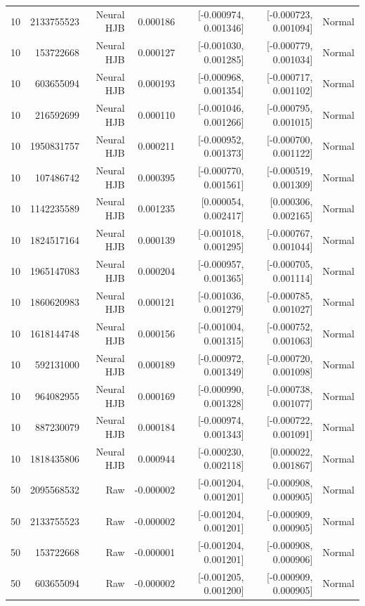 \begin{longtable}{lrrrrrr}
10 & 2133755523 & Neural HJB & 0.000186 & [-0.000974, 0.001346] & [-0.000723, 0.001094] & Normal \\
10 & 153722668 & Neural HJB & 0.000127 & [-0.001030, 0.001285] & [-0.000779, 0.001034] & Normal \\
10 & 603655094 & Neural HJB & 0.000193 & [-0.000968, 0.001354] & [-0.000717, 0.001102] & Normal \\
10 & 216592699 & Neural HJB & 0.000110 & [-0.001046, 0.001266] & [-0.000795, 0.001015] & Normal \\
10 & 1950831757 & Neural HJB & 0.000211 & [-0.000952, 0.001373] & [-0.000700, 0.001122] & Normal \\
10 & 107486742 & Neural HJB & 0.000395 & [-0.000770, 0.001561] & [-0.000519, 0.001309] & Normal \\
10 & 1142235589 & Neural HJB & 0.001235 & [0.000054, 0.002417] & [0.000306, 0.002165] & Normal \\
10 & 1824517164 & Neural HJB & 0.000139 & [-0.001018, 0.001295] & [-0.000767, 0.001044] & Normal \\
10 & 1965147083 & Neural HJB & 0.000204 & [-0.000957, 0.001365] & [-0.000705, 0.001114] & Normal \\
10 & 1860620983 & Neural HJB & 0.000121 & [-0.001036, 0.001279] & [-0.000785, 0.001027] & Normal \\
10 & 1618144748 & Neural HJB & 0.000156 & [-0.001004, 0.001315] & [-0.000752, 0.001063] & Normal \\
10 & 592131000 & Neural HJB & 0.000189 & [-0.000972, 0.001349] & [-0.000720, 0.001098] & Normal \\
10 & 964082955 & Neural HJB & 0.000169 & [-0.000990, 0.001328] & [-0.000738, 0.001077] & Normal \\
10 & 887230079 & Neural HJB & 0.000184 & [-0.000974, 0.001343] & [-0.000722, 0.001091] & Normal \\
10 & 1818435806 & Neural HJB & 0.000944 & [-0.000230, 0.002118] & [0.000022, 0.001867] & Normal \\
50 & 2095568532 & Raw & -0.000002 & [-0.001204, 0.001201] & [-0.000908, 0.000905] & Normal \\
50 & 2133755523 & Raw & -0.000002 & [-0.001204, 0.001201] & [-0.000909, 0.000905] & Normal \\
50 & 153722668 & Raw & -0.000001 & [-0.001204, 0.001201] & [-0.000908, 0.000906] & Normal \\
50 & 603655094 & Raw & -0.000002 & [-0.001205, 0.001200] & [-0.000909, 0.000905] & Normal \\

\end{longtable}

